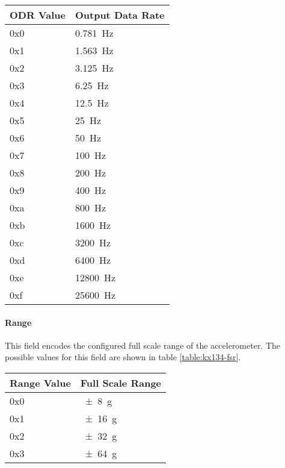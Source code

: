 \begin{table*}[htb]
    \centering
    \begin{tabular}{@{}ll@{}}
        \toprule
        ODR Value & Output Data Rate     \\
        \midrule
        0x0       & {\SI{0.781}{\hertz}} \\
        0x1       & {\SI{1.563}{\hertz}} \\
        0x2       & {\SI{3.125}{\hertz}} \\
        0x3       & {\SI{6.25}{\hertz}}  \\
        0x4       & {\SI{12.5}{\hertz}}  \\
        0x5       & {\SI{25}{\hertz}}    \\
        0x6       & {\SI{50}{\hertz}}    \\
        0x7       & {\SI{100}{\hertz}}   \\
        0x8       & {\SI{200}{\hertz}}   \\
        0x9       & {\SI{400}{\hertz}}   \\
        0xa       & {\SI{800}{\hertz}}   \\
        0xb       & {\SI{1600}{\hertz}}  \\
        0xc       & {\SI{3200}{\hertz}}  \\
        0xd       & {\SI{6400}{\hertz}}  \\
        0xe       & {\SI{12800}{\hertz}} \\
        0xf       & {\SI{25600}{\hertz}} \\
        \bottomrule
    \end{tabular}
    \caption{KX134-1211 Output Data Rate Values}
    \label{table:kx134-odr}
\end{table*}

\paragraph{Range}
This field encodes the configured full scale range of the accelerometer. The possible values for this field are shown
in table \ref{table:kx134-fsr}.

\begin{table*}[htb]
    \centering
    \begin{tabular}{@{}ll@{}}
        \toprule
        Range Value & Full Scale Range \\
        \midrule
        0x0         & {\SI{\pm 8}{g}}  \\
        0x1         & {\SI{\pm 16}{g}} \\
        0x2         & {\SI{\pm 32}{g}} \\
        0x3         & {\SI{\pm 64}{g}} \\
        \bottomrule
    \end{tabular}
    \caption{KX134-1211 Full Scale Range Values}
    \label{table:kx134-fsr}
\end{table*}


